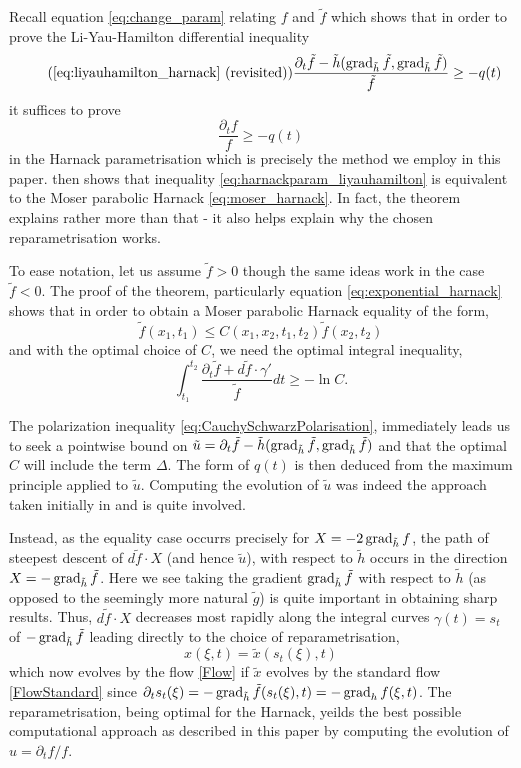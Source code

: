 \begin{rem}
\label{rem:reparam}
Recall equation \eqref{eq:change_param} relating $f$ and $\tilde{f}$ which shows that in order to prove the Li-Yau-Hamilton differential inequality
\[
\tag{\ref{eq:liyauhamilton_harnack} (revisited)}
\frac{\partial_t\tilde{f} - \tilde{h}(\grad_{\tilde{h}} \tilde{f}, \grad_{\tilde{h}} \tilde{f})}{\tilde{f}} \geq -q(t)
\]
it suffices to prove
\begin{equation}
\label{eq:harnackparam_liyauhamilton}
\frac{\partial_t f}{f} \geq -q(t)
\end{equation}
in the Harnack parametrisation which is precisely the method we employ in this paper.  then shows that inequality \eqref{eq:harnackparam_liyauhamilton} is equivalent to the Moser parabolic Harnack \eqref{eq:moser_harnack}. In fact, the theorem explains rather more than that - it also helps explain why the chosen reparametrisation works.

To ease notation, let us assume $\tilde{f} > 0$ though the same ideas work in the case $\tilde{f} < 0$. The proof of the theorem, particularly equation \eqref{eq:exponential_harnack} shows that in order to obtain a Moser parabolic Harnack equality of the form,
\[
\tilde{f}(x_1, t_1) \leq C(x_1, x_2, t_1, t_2) \tilde{f}(x_2, t_2)
\]
and with the optimal choice of $C$, we need the optimal integral inequality,
\[
\int_{t_1}^{t_2} \frac{\partial_t \tilde{f} + d\tilde{f} \cdot \gamma'}{\tilde{f}} dt \geq - \ln C.
\]

The polarization inequality \eqref{eq:CauchySchwarzPolarisation}, immediately leads us to seek a pointwise bound on $\tilde{u} = \partial_t \tilde{f} - \tilde{h} (\operatorname{grad}_{\tilde{h}} \tilde{f}, \operatorname{grad}_{\tilde{h}} \tilde{f})$ and that the optimal $C$ will include the term $\Delta$. The form of $q(t)$ is then deduced from the maximum principle applied to $\tilde{u}$. Computing the evolution of $\tilde{u}$ was indeed the approach taken initially in \cite{Hamilton:/1995,Chow:/1985} and is quite involved.

Instead, as the equality case occurrs precisely for $X = -2 \operatorname{grad}_{\tilde{h}} f$, the path of steepest descent of $d\tilde{f} \cdot X$ (and hence $\tilde{u}$), with respect to $\tilde{h}$ occurs in the direction $X = - \operatorname{grad}_{\tilde{h}} \tilde{f}$. Here we see taking the gradient $\operatorname{grad}_{\tilde{h}} \tilde{f}$ with respect to $\tilde{h}$ (as opposed to the seemingly more natural $\tilde{g}$) is quite important in obtaining sharp results. Thus, $d\tilde{f} \cdot X$ decreases most rapidly along the integral curves $\gamma(t) = s_t$ of $-\operatorname{grad}_{\tilde{h}} \tilde{f}$ leading directly to the choice of reparametrisation,
\[
x(\xi, t) = \tilde{x}(s_t(\xi), t)
\]
which now evolves by the flow \eqref{Flow} if $\tilde{x}$ evolves by the standard flow \eqref{FlowStandard} since $\partial_t s_t (\xi)= - \operatorname{grad}_{\tilde{h}} \tilde{f} (s_t(\xi), t) = - \operatorname{grad}_{h} f (\xi, t)$. The reparametrisation, being optimal for the Harnack, yeilds the best possible computational approach as described in this paper by computing the evolution of $u = \partial_t f/f$.
\end{rem}

